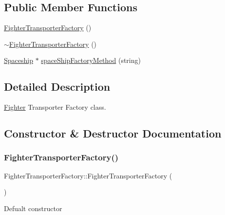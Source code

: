 \subsection*{Public Member Functions}
\begin{DoxyCompactItemize}
\item 
\hyperlink{classFighterTransporterFactory_a6491bf6c6026a412f38df451c0ba7899}{Fighter\+Transporter\+Factory} ()
\item 
\hyperlink{classFighterTransporterFactory_a1ed7e181f7c2ecbfc7b7e69c1085637f}{$\sim$\+Fighter\+Transporter\+Factory} ()
\item 
\hyperlink{classSpaceship}{Spaceship} $\ast$ \hyperlink{classFighterTransporterFactory_a1f2a5002cb9ea812fee8d224884fbdff}{space\+Ship\+Factory\+Method} (string)
\end{DoxyCompactItemize}


\subsection{Detailed Description}
\hyperlink{classFighter}{Fighter} Transporter Factory class. 

\subsection{Constructor \& Destructor Documentation}
\mbox{\label{classFighterTransporterFactory_a6491bf6c6026a412f38df451c0ba7899}} 
\subsubsection{\texorpdfstring{Fighter\+Transporter\+Factory()}{FighterTransporterFactory()}}
{\footnotesize\ttfamily Fighter\+Transporter\+Factory\+::\+Fighter\+Transporter\+Factory (\begin{DoxyParamCaption}{ }\end{DoxyParamCaption})}

Defualt constructor \mbox{\label{classFighterTransporterFactory_a1ed7e181f7c2ecbfc7b7e69c1085637f}} 
